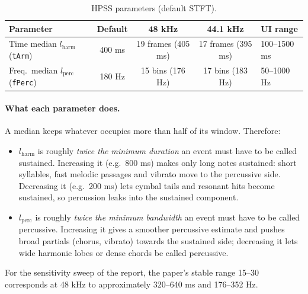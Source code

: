 \documentclass[11pt,a4paper]{article}
\newcommand{\code}[1]{\texttt{#1}}
\begin{document}
\begin{table}[htbp]
\centering
\caption{HPSS parameters (default STFT).}
\label{tab:hpss}
\begin{tabularx}{\linewidth}{@{}p{2.6cm}cccL@{}}
\toprule
Parameter & Default & 48 kHz & 44.1 kHz & UI range \\
\midrule
Time median $l_{\text{harm}}$ (\code{tArm}) & 400 ms & 19 frames (405 ms) & 17 frames (395 ms) & 100--1500 ms \\
Freq.\ median $l_{\text{perc}}$ (\code{fPerc}) & 180 Hz & 15 bins (176 Hz) & 17 bins (183 Hz) & 50--1000 Hz \\
\bottomrule
\end{tabularx}
\end{table}

\paragraph{What each parameter does.} A median keeps whatever occupies
more than half of its window. Therefore:
\begin{itemize}
  \item $l_{\text{harm}}$ is roughly \emph{twice the minimum duration} an
        event must have to be called sustained. Increasing it (e.g.\ 800 ms)
        makes only long notes sustained: short syllables, fast melodic
        passages and vibrato move to the percussive side. Decreasing it
        (e.g.\ 200 ms) lets cymbal tails and resonant hits become sustained,
        so percussion leaks into the sustained component.
  \item $l_{\text{perc}}$ is roughly \emph{twice the minimum bandwidth} an
        event must have to be called percussive. Increasing it gives a
        smoother percussive estimate and pushes broad partials (chorus,
        vibrato) towards the sustained side; decreasing it lets wide
        harmonic lobes or dense chords be called percussive.
\end{itemize}
For the sensitivity sweep of the report, the paper's stable range
15--30 corresponds at 48 kHz to approximately 320--640 ms and
176--352 Hz.
\end{document}
